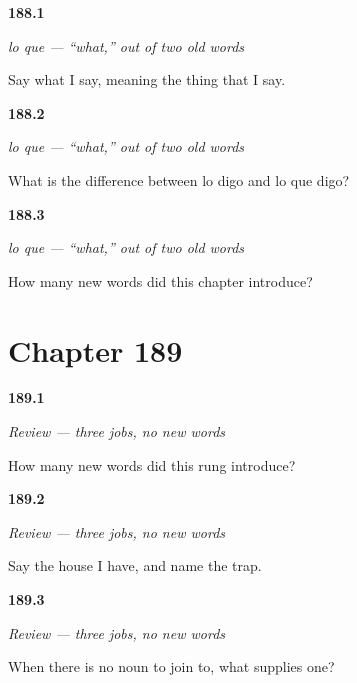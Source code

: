 \noindent\begin{minipage}[t]{\linewidth}
\raggedright
\hypertarget{review-ES-C53-lo-que-say}{\textbf{188.1}} \emph{lo que — \textquotedblleft{}what,\textquotedblright{} out of two old words}\par
\small Say what I say, meaning the thing that I say.
\end{minipage}\par\medskip

\noindent\begin{minipage}[t]{\linewidth}
\raggedright
\hypertarget{review-ES-C53-lo-que-contrast}{\textbf{188.2}} \emph{lo que — \textquotedblleft{}what,\textquotedblright{} out of two old words}\par
\small What is the difference between lo digo and lo que digo?
\end{minipage}\par\medskip

\noindent\begin{minipage}[t]{\linewidth}
\raggedright
\hypertarget{review-ES-C53-lo-que-new}{\textbf{188.3}} \emph{lo que — \textquotedblleft{}what,\textquotedblright{} out of two old words}\par
\small How many new words did this chapter introduce?
\end{minipage}\par\medskip

\section*{Chapter 189}

\noindent\begin{minipage}[t]{\linewidth}
\raggedright
\hypertarget{review-ES-C53-repaso-que-none}{\textbf{189.1}} \emph{Review — three jobs, no new words}\par
\small How many new words did this rung introduce?
\end{minipage}\par\medskip

\noindent\begin{minipage}[t]{\linewidth}
\raggedright
\hypertarget{review-ES-C53-repaso-que-drop}{\textbf{189.2}} \emph{Review — three jobs, no new words}\par
\small Say the house I have, and name the trap.
\end{minipage}\par\medskip

\noindent\begin{minipage}[t]{\linewidth}
\raggedright
\hypertarget{review-ES-C53-repaso-que-hole}{\textbf{189.3}} \emph{Review — three jobs, no new words}\par
\small When there is no noun to join to, what supplies one?
\end{minipage}\par\medskip

